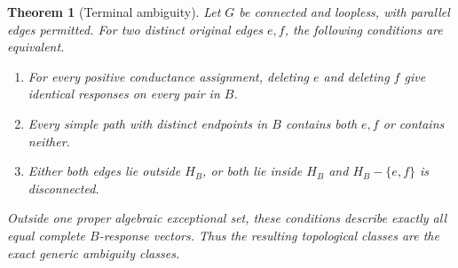 \documentclass[11pt,letterpaper]{article}
\newtheorem{theorem}{Theorem}
\begin{document}
\begin{theorem}[Terminal ambiguity]\label{thm:terminal}
Let $G$ be connected and loopless, with parallel edges permitted. For two distinct original edges $e,f$, the following conditions are equivalent.
\begin{enumerate}
\item For every positive conductance assignment, deleting $e$ and deleting $f$ give identical responses on every pair in $B$.
\item Every simple path with distinct endpoints in $B$ contains both $e,f$ or contains neither.
\item Either both edges lie outside $H_B$, or both lie inside $H_B$ and $H_B-\{e,f\}$ is disconnected.
\end{enumerate}
Outside one proper algebraic exceptional set, these conditions describe exactly all equal complete $B$-response vectors. Thus the resulting topological classes are the exact generic ambiguity classes.
\end{theorem}
\end{document}
